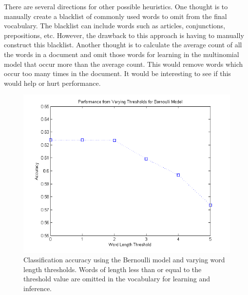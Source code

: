 \documentclass[12pt]{article}
\begin{document}
There are several directions for other possible heuristics. One thought is to manually create a blacklist of commonly used words to omit from the final vocabulary. The blacklist can include words such as articles, conjunctions, prepositions, etc. However, the drawback to this approach is having to manually construct this blacklist. Another thought is to calculate the average count of all the words in a document and omit those words for learning in the multinomial model that occur more than the average count. This would remove words which occur too many times in the document. It would be interesting to see if this would help or hurt performance.

\begin{figure}[!t]
  \centering
  \includegraphics[scale=.60]{img/vocabthreshold_bern.png}
  \caption{Classification accuracy using the Bernoulli model and varying word length thresholds. Words of length less than or equal to the threshold value are omitted in the vocabulary for learning and inference.}
  \label{fig:vocabthreshold_bern}
\end{figure}
\end{document}
